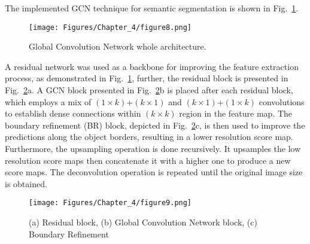 The implemented GCN technique for semantic segmentation is shown in Fig.~\ref{fig:gcn}.
\begin{figure} [h!]
	\begin{center}
		\texttt{[image: Figures/Chapter\_4/figure8.png]}
	\end{center}
	\caption{Global Convolution Network whole architecture.} 
	\label{fig:gcn}
\end{figure}

A residual network was used as a backbone for improving the feature extraction process, as demonstrated in Fig.~\ref{fig:gcn}, further, the residual block is presented in Fig.~\ref{fig:res_gcn_br}a.
A GCN block presented in Fig.~\ref{fig:res_gcn_br}b is placed after each residual block, which employs a mix of \((1\times k)\)+\((k\times 1)\) and \((k\times 1)\)+\((1\times k)\) convolutions to establish dense connections within \((k\times k)\) region in the feature map.
The boundary refinement (BR) block, depicted in Fig.~\ref{fig:res_gcn_br}c, is then used to improve the predictions along the object borders, resulting in a lower resolution score map.
Furthermore, the upsampling operation is done recursively. 
It upsamples the low resolution score maps then concatenate it with a higher one to produce a new 
score maps.
The deconvolution operation is repeated until the original image size is 
obtained.
\begin{figure} [h!]
	\begin{center}
		\texttt{[image: Figures/Chapter\_4/figure9.png]}
	\end{center}
	\caption{(a) Residual block, (b) Global Convolution Network block, (c) 
		Boundary Refinement} 
	\label{fig:res_gcn_br}
\end{figure}